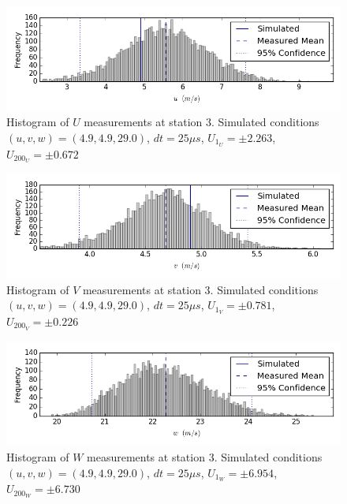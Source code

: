 \begin{figure}[H]
\centering
\includegraphics[width=6in]{figs/Ely_May28th03001/uncertainty_Ely_May28th03001_U}
\caption{Histogram of $U$ measurements at station 3. Simulated conditions $(u,v,w)=(4.9, 4.9, 29.0)$, $dt=25 \mu s$, $U_1_U=\pm 2.263$, $U_200_U=\pm 0.672$}
\label{fig:uncertainty_Ely_May28th03001_U}
\end{figure}


\begin{figure}[H]
\centering
\includegraphics[width=6in]{figs/Ely_May28th03001/uncertainty_Ely_May28th03001_V}
\caption{Histogram of $V$ measurements at station 3. Simulated conditions $(u,v,w)=(4.9, 4.9, 29.0)$, $dt=25 \mu s$, $U_1_V=\pm 0.781$, $U_200_V=\pm 0.226$}
\label{fig:uncertainty_Ely_May28th03001_V}
\end{figure}


\begin{figure}[H]
\centering
\includegraphics[width=6in]{figs/Ely_May28th03001/uncertainty_Ely_May28th03001_W}
\caption{Histogram of $W$ measurements at station 3. Simulated conditions $(u,v,w)=(4.9, 4.9, 29.0)$, $dt=25 \mu s$, $U_1_W=\pm 6.954$, $U_200_W=\pm 6.730$}
\label{fig:uncertainty_Ely_May28th03001_W}
\end{figure}


